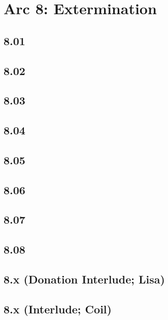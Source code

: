\part{Arc 8: Extermination}
 \chapter{8.01}
 \chapter{8.02}
 \chapter{8.03}
 \chapter{8.04}
 \chapter{8.05}
 \chapter{8.06}
 \chapter{8.07}
 \chapter{8.08}
 \chapter{8.x (Donation Interlude; Lisa)}
 \chapter{8.x (Interlude; Coil)}












